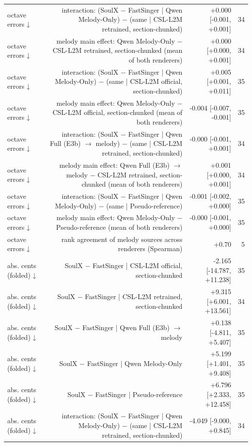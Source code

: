 \begin{table}[t]
\begin{tabular}{lrrr}
octave errors ↓ & interaction: (SoulX $-$ FastSinger | Qwen Melody-Only) $-$ (same | CSL-L2M retrained, section-chunked) & +0.000 [-0.001, +0.001] & 34 \\
octave errors ↓ & melody main effect: Qwen Melody-Only $-$ CSL-L2M retrained, section-chunked (mean of both renderers) & +0.000 [+0.000, +0.001] & 34 \\
octave errors ↓ & interaction: (SoulX $-$ FastSinger | Qwen Melody-Only) $-$ (same | CSL-L2M official, section-chunked) & +0.005 [+0.001, +0.011] & 35 \\
octave errors ↓ & melody main effect: Qwen Melody-Only $-$ CSL-L2M official, section-chunked (mean of both renderers) & -0.004 [-0.007, -0.001] & 35 \\
octave errors ↓ & interaction: (SoulX $-$ FastSinger | Qwen Full (E3b) $\rightarrow$ melody) $-$ (same | CSL-L2M retrained, section-chunked) & -0.000 [-0.001, +0.001] & 34 \\
octave errors ↓ & melody main effect: Qwen Full (E3b) $\rightarrow$ melody $-$ CSL-L2M retrained, section-chunked (mean of both renderers) & +0.001 [+0.000, +0.001] & 34 \\
octave errors ↓ & interaction: (SoulX $-$ FastSinger | Qwen Melody-Only) $-$ (same | Pseudo-reference) & -0.001 [-0.002, +0.000] & 35 \\
octave errors ↓ & melody main effect: Qwen Melody-Only $-$ Pseudo-reference (mean of both renderers) & -0.000 [-0.001, +0.000] & 35 \\
octave errors ↓ & rank agreement of melody sources across renderers (Spearman) & +0.70 & 5 \\
abs. cents (folded) ↓ & SoulX $-$ FastSinger | CSL-L2M official, section-chunked & -2.165 [-14.787, +11.238] & 35 \\
abs. cents (folded) ↓ & SoulX $-$ FastSinger | CSL-L2M retrained, section-chunked & +9.315 [+6.001, +13.561] & 34 \\
abs. cents (folded) ↓ & SoulX $-$ FastSinger | Qwen Full (E3b) $\rightarrow$ melody & +0.138 [-4.811, +5.407] & 35 \\
abs. cents (folded) ↓ & SoulX $-$ FastSinger | Qwen Melody-Only & +5.199 [+1.401, +9.408] & 35 \\
abs. cents (folded) ↓ & SoulX $-$ FastSinger | Pseudo-reference & +6.796 [+2.333, +12.458] & 35 \\
abs. cents (folded) ↓ & interaction: (SoulX $-$ FastSinger | Qwen Melody-Only) $-$ (same | CSL-L2M retrained, section-chunked) & -4.049 [-9.000, +0.845] & 34 \\

\end{tabular}
\end{table}
